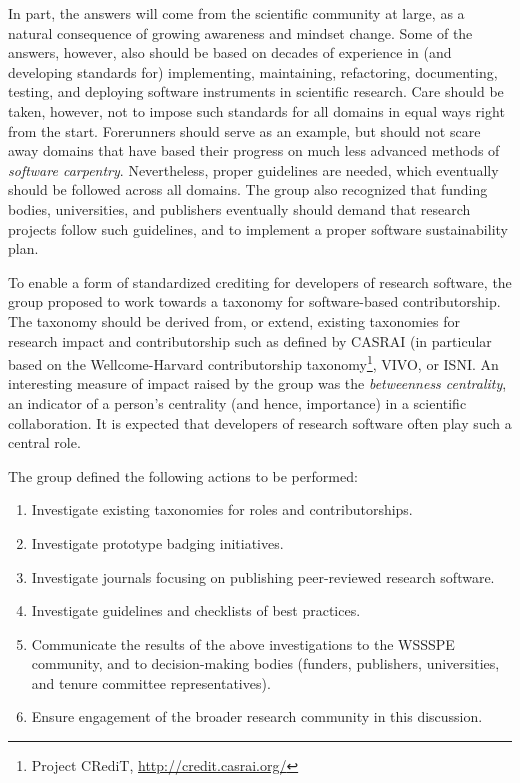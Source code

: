 \documentclass[11pt, oneside]{amsart}
\newcommand{\choinote}[1]{ {\textcolor{orange}    {***Choi: #1 }}}
\begin{document}
In part, the answers will come from the scientific community at large, as a
natural consequence of growing awareness and mindset change. Some of the
answers, however, also should be based on decades of experience in (and
developing standards for) implementing, maintaining, refactoring, documenting,
testing, and deploying software instruments in scientific research. Care should
be taken, however, not to impose such standards for all domains in equal ways
right from the start. Forerunners should serve as an example, but should not
scare away domains that have based their progress on much less advanced methods
of {\em software carpentry}. Nevertheless, proper guidelines are needed, which
eventually should be followed across all domains. The group also recognized that
funding bodies, universities, and publishers eventually should demand that
research projects follow such guidelines, and to implement a proper software
sustainability plan.

To enable a form of standardized crediting for developers of research software,
the group proposed to work towards a taxonomy for software-based
contributorship. The taxonomy should be derived from, or extend, existing
taxonomies for research impact and contributorship such as defined by CASRAI (in
particular based on the Wellcome-Harvard contributorship
taxonomy\footnote{Project CRediT, \url{http://credit.casrai.org/}}, VIVO, or
ISNI. An interesting measure of impact raised by the group was the {\em
betweenness centrality}, an indicator of a person's centrality (and hence,
importance) in a scientific collaboration. It is expected that developers of
research software often play such a central role. %

The group defined the following actions to be performed:
\begin{enumerate}
\item Investigate existing taxonomies for roles and contributorships.
\item Investigate prototype badging initiatives.
\item Investigate journals focusing on publishing peer-reviewed research
software.
\item Investigate guidelines and checklists of best practices.
\item Communicate the results of the above investigations to the WSSSPE
community, and to decision-making bodies (funders, publishers, universities,
and tenure committee representatives).
\item Ensure engagement of the broader research community in this discussion.
\end{enumerate}
\end{document}
